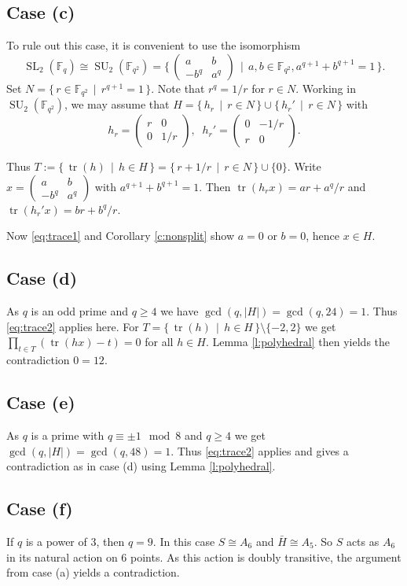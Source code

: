 \documentclass[12pt]{amsart}
\theoremstyle{plain}
\theoremstyle{definition}
\numberwithin{equation}{section}
\newcommand{\abs}[1]{\lvert#1\rvert}
\newcommand*{\set}[1]{\{#1\}}
\newcommand*{\defset}[2]{\{\,#1\,\mid\,#2\,\}}
\newcommand{\FF}{\mathbb F}
\newcommand{\bH}{\bar{H}}
\DeclareMathOperator{\SL}{SL}
\DeclareMathOperator{\SU}{SU}
\DeclareMathOperator{\trace}{tr}
\begin{document}
\subsection{Case (c)} 
To rule out this case, it is convenient to use the isomorphism
\[
  \SL_2(\FF_q)\cong\SU_2(\FF_{q^2})%
  =\defset{%
    \begin{pmatrix}a & b\\-b^q & a^q\end{pmatrix}}{a, b\in\FF_{q^2},
    a^{q+1}+b^{q+1}=1}.
  \]
  Set $N=\defset{r\in\FF_{q^2}}{r^{q+1}=1}$. Note that $r^q=1/r$ for
  $r\in N$. Working in $\SU_2(\FF_{q^2})$, we may assume that
  $H=\defset{h_r}{r\in N}\cup\defset{h_r'}{r\in N}$ with
\[
  h_r=\begin{pmatrix}r & 0\\0 & 1/r\end{pmatrix},\;\;
  h_r'=\begin{pmatrix}0 & -1/r\\r & 0\end{pmatrix}.\]

Thus
$T:=\defset{\trace(h)}{h\in H}=\defset{r+1/r}{r\in
  N}\cup\set{0}$. Write
$x=\begin{pmatrix}a & b\\-b^q & a^q\end{pmatrix}$ with
$a^{q+1}+b^{q+1}=1$. Then $\trace(h_rx)=ar+a^q/r$ and
$\trace(h_r'x)=br+b^q/r$.

Now \eqref{eq:trace1} and Corollary \ref{c:nonsplit} show $a=0$ or
$b=0$, hence $x\in H$.
\subsection{Case (d)}
As $q$ is an odd prime and $q\ge4$ we have
$\gcd(q,\abs{H})=\gcd(q,24)=1$. Thus \eqref{eq:trace2} applies
here. For $T=\defset{\trace(h)}{h\in H}\setminus\set{-2, 2}$ we get
$\prod_{t\in T}(\trace(hx)-t)=0$ for all $h\in H$. Lemma
\ref{l:polyhedral} then yields the contradiction $0=12$.
\subsection{Case (e)}
As $q$ is a prime with $q\equiv\pm1\mod{8}$ and $q\ge4$ we get
$\gcd(q,\abs{H})=\gcd(q,48)=1$. Thus \eqref{eq:trace2} applies and
gives a contradiction as in case (d) using Lemma \ref{l:polyhedral}.
\subsection{Case (f)}
If $q$ is a power of $3$, then $q=9$. In this case $S\cong A_6$ and
$\bH\cong A_5$. So $S$ acts as $A_6$ in its natural action on $6$
points. As this action is doubly transitive, the argument from case
(a) yields a contradiction.
\end{document}
